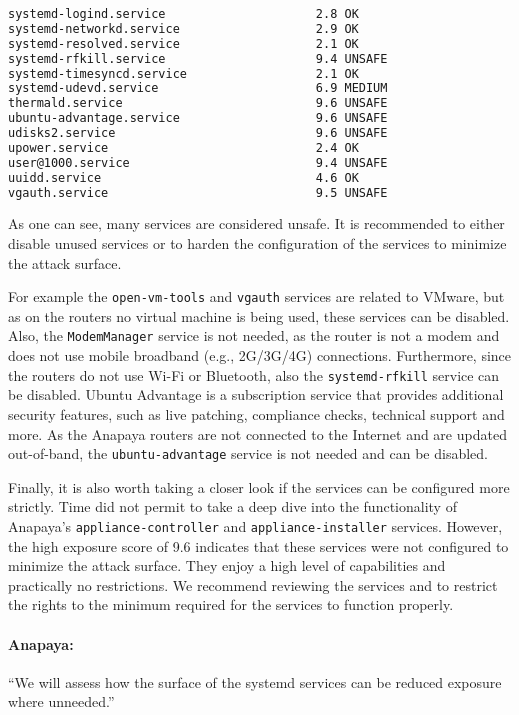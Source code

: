 \begin{lstlisting}[language=bash, deletekeywords={local}, numbers=none, caption={Output of \texttt{systemd-analyze security} on the device in Thun running Anapaya's system version v2.8.0.}]
systemd-logind.service                     2.8 OK        
systemd-networkd.service                   2.9 OK        
systemd-resolved.service                   2.1 OK        
systemd-rfkill.service                     9.4 UNSAFE    
systemd-timesyncd.service                  2.1 OK        
systemd-udevd.service                      6.9 MEDIUM    
thermald.service                           9.6 UNSAFE    
ubuntu-advantage.service                   9.6 UNSAFE    
udisks2.service                            9.6 UNSAFE    
upower.service                             2.4 OK        
user@1000.service                          9.4 UNSAFE    
uuidd.service                              4.6 OK        
vgauth.service                             9.5 UNSAFE    
\end{lstlisting}

As one can see, many services are considered unsafe.
It is recommended to either disable unused services or to harden the configuration of the services to minimize the attack surface.

For example the \texttt{open-vm-tools} and \texttt{vgauth} services are related to VMware, but as on the routers no virtual machine is being used, these services can be disabled.
Also, the \texttt{ModemManager} service is not needed, as the router is not a modem and does not use mobile broadband (e.g., 2G/3G/4G) connections.
Furthermore, since the routers do not use Wi-Fi or Bluetooth, also the \texttt{systemd-rfkill} service can be disabled.
Ubuntu Advantage is a subscription service that provides additional security features, such as live patching, compliance checks, technical support and more.
As the Anapaya routers are not connected to the Internet and are updated out-of-band, the \texttt{ubuntu-advantage} service is not needed and can be disabled.

Finally, it is also worth taking a closer look if the services can be configured more strictly.
Time did not permit to take a deep dive into the functionality of Anapaya's \texttt{appliance-controller} and \texttt{appliance-installer} services.
However, the high exposure score of 9.6 indicates that these services were not configured to minimize the attack surface.
They enjoy a high level of capabilities and practically no restrictions.
We recommend reviewing the services and to restrict the rights to the minimum required for the services to function properly.

\begin{boxH}
\paragraph{Anapaya:}
``We will assess how the surface of the systemd services can be reduced exposure where unneeded.''
\end{boxH}

